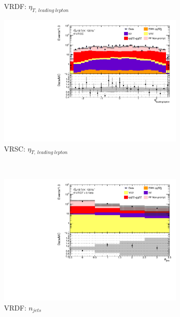 \begin{figure}[htb]
\begin{subfigure}{.48\textwidth}
        \caption{VRDF: $\eta_{T,~leading~lepton}$ \label{fig:AllDataMCYield_VRDF_eta1} }
    \end{subfigure}
    \begin{subfigure}{.48\textwidth}
        \centering
        \includegraphics[width = 0.85\linewidth]{figures/Analysis/Background/Overlay_VRSC_FFApplied_eta1.pdf}
        \caption{VRSC: $\eta_{T,~leading~lepton}$ \label{fig:AllDataMCYield_VRSC_eta1} }
    \end{subfigure}\\
    \begin{subfigure}{.48\textwidth}
        \centering
        \includegraphics[width = 0.85\linewidth]{figures/Analysis/Background/Overlay_VRDF_FFApplied_n_jets.pdf}
        \caption{VRDF: $n_{jets}$ \label{fig:AllDataMCYield_VRDF_njet} }
    \end{subfigure}
    \begin{subfigure}{.48\textwidth}
        \centering

\end{subfigure}
\end{figure}

